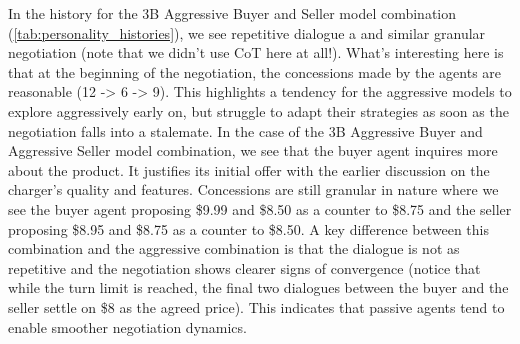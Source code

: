 \documentclass[11pt]{article}
\begin{document}
In the history for the 3B Aggressive Buyer and Seller model combination (\ref{tab:personality_histories}), we see repetitive dialogue a and similar granular negotiation (note that we didn't use CoT here at all!). What's interesting here is that at the beginning of the negotiation, the concessions made by the agents are reasonable (12 -> 6 -> 9). This highlights a tendency for the aggressive models to explore aggressively early on, but struggle to adapt their strategies as soon as the negotiation falls into a stalemate. In the case of the 3B Aggressive Buyer and Aggressive Seller model combination, we see that the buyer agent inquires more about the product. It justifies its initial offer with the earlier discussion on the charger's quality and features. Concessions are still granular in nature where we see the buyer agent proposing \$9.99 and \$8.50 as a counter to \$8.75 and the seller proposing \$8.95 and \$8.75 as a counter to \$8.50. A key difference between this combination and the aggressive combination is that the dialogue is not as repetitive and the negotiation shows clearer signs of convergence (notice that while the turn limit is reached, the final two dialogues between the buyer and the seller settle on \$8 as the agreed price). This indicates that passive agents tend to enable smoother negotiation dynamics. 

\clearpage
\end{document}
